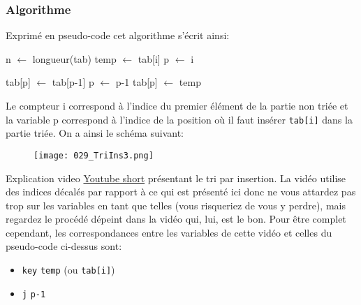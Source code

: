 \documentclass[12pt]{article}
\begin{document}
	\subsubsection*{Algorithme}
	\begin{MaReponse}
		Exprimé en pseudo-code cet algorithme s'écrit ainsi:
		
		\begin{algorithmic}[1]
			\State n $\leftarrow$ longueur(tab)
			\State temp $\leftarrow$ tab[i]
			\State p $\leftarrow$ i
			
			\State tab[p] $\leftarrow$ tab[p-1]
			\State p $\leftarrow$ p-1
			\EndWhile
			\State tab[p] $\leftarrow$ temp
			\EndFor
			\State{}
			\EndFunction
		\end{algorithmic}
		
		Le compteur i correspond à l'indice du premier élément de la partie non triée et la variable p correspond à l'indice de la position où il faut insérer \texttt{tab[i]} dans la partie triée. On a ainsi le schéma suivant:
		\begin{figure}[H]
			\centering
			\texttt{[image: 029\_TriIns3.png]}
		\end{figure}
	\end{MaReponse}
	
	\begin{MonAmp}{Explication video}
		\href{https://www.youtube.com/shorts/ZZ-Oz1IFfPg?feature=share}{Youtube short} présentant le tri par insertion. La vidéo utilise des indices décalés par rapport à ce qui est présenté ici donc ne vous attardez pas trop sur les variables en tant que telles (vous risqueriez de vous y perdre), mais regardez le procédé dépeint dans la vidéo qui, lui, est le bon. Pour être complet cependant, les correspondances entre les variables de cette vidéo et celles du pseudo-code ci-dessus sont:
		\begin{itemize}
			\item \texttt{key} \quad \faExchange \quad \texttt{temp} (ou \texttt{tab[i]})
			\item \texttt{j} \quad \faExchange \quad \texttt{p-1}
		\end{itemize}
	\end{MonAmp}
	
\end{document}
